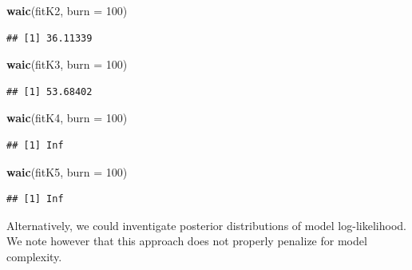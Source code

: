 \documentclass[]{article}
\newenvironment{Shaded}{\begin{snugshade}}{\end{snugshade}}
\newcommand{\DataTypeTok}[1]{\textcolor[rgb]{0.13,0.29,0.53}{#1}}
\newcommand{\DecValTok}[1]{\textcolor[rgb]{0.00,0.00,0.81}{#1}}
\newcommand{\KeywordTok}[1]{\textcolor[rgb]{0.13,0.29,0.53}{\textbf{#1}}}
\newcommand{\NormalTok}[1]{#1}
\begin{document}
\begin{Shaded}
\begin{Highlighting}[]
\KeywordTok{waic}\NormalTok{(fitK2, }\DataTypeTok{burn =} \DecValTok{100}\NormalTok{)}
\end{Highlighting}
\end{Shaded}

\begin{verbatim}
## [1] 36.11339
\end{verbatim}

\begin{Shaded}
\begin{Highlighting}[]
\KeywordTok{waic}\NormalTok{(fitK3, }\DataTypeTok{burn =} \DecValTok{100}\NormalTok{)}
\end{Highlighting}
\end{Shaded}

\begin{verbatim}
## [1] 53.68402
\end{verbatim}

\begin{Shaded}
\begin{Highlighting}[]
\KeywordTok{waic}\NormalTok{(fitK4, }\DataTypeTok{burn =} \DecValTok{100}\NormalTok{)}
\end{Highlighting}
\end{Shaded}

\begin{verbatim}
## [1] Inf
\end{verbatim}

\begin{Shaded}
\begin{Highlighting}[]
\KeywordTok{waic}\NormalTok{(fitK5, }\DataTypeTok{burn =} \DecValTok{100}\NormalTok{)}
\end{Highlighting}
\end{Shaded}

\begin{verbatim}
## [1] Inf
\end{verbatim}

Alternatively, we could inventigate posterior distributions of model
log-likelihood. We note however that this approach does not properly
penalize for model complexity.
\end{document}

